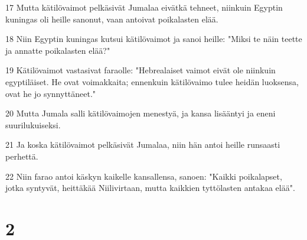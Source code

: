 \par 17 Mutta kätilövaimot pelkäsivät Jumalaa eivätkä tehneet, niinkuin Egyptin kuningas oli heille sanonut, vaan antoivat poikalasten elää.
\par 18 Niin Egyptin kuningas kutsui kätilövaimot ja sanoi heille: "Miksi te näin teette ja annatte poikalasten elää?"
\par 19 Kätilövaimot vastasivat faraolle: "Hebrealaiset vaimot eivät ole niinkuin egyptiläiset. He ovat voimakkaita; ennenkuin kätilövaimo tulee heidän luoksensa, ovat he jo synnyttäneet."
\par 20 Mutta Jumala salli kätilövaimojen menestyä, ja kansa lisääntyi ja eneni suurilukuiseksi.
\par 21 Ja koska kätilövaimot pelkäsivät Jumalaa, niin hän antoi heille runsaasti perhettä.
\par 22 Niin farao antoi käskyn kaikelle kansallensa, sanoen: "Kaikki poikalapset, jotka syntyvät, heittäkää Niilivirtaan, mutta kaikkien tyttölasten antakaa elää".

\chapter{2}

